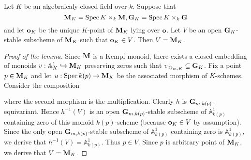 \begin{lemma}\label{lemma:open_stable_subset_of_monoid_that_contains_zero_is_monoid_itself}
Let $K$ be an algebraicaly closed field over $k$. Suppose that
$$\mathbf{M}_K = \mathrm{Spec}\, K \times_k\mathbf{M},\mathbf{G}_K =\mathrm{Spec}\, K \times_k\mathbf{G}$$
and let $\mathbf{o}_K$ be the unique $K$-point of $\mathbf{M}_K$ lying over $\mathbf{o}$. Let $V$ be an open $\mathbf{G}_K$-stable subscheme of $\mathbf{M}_K$ such that $\mathbf{o}_K\in V$. Then $V = \mathbf{M}_K$.
\end{lemma}
\begin{proof}[Proof of the lemma]
Since $\mathbf{M}$ is a Kempf monoid, there exists a closed embedding of monoids $v:\mathbb{A}^1_K\hookrightarrow \mathbf{M}_K$ preserving zeros such that $v_{\mid \mathbb{G}_{m,K}}\subseteq \mathbf{G}_K$. Fix a point $p \in \mathbf{M}_K$ and let $u:\mathrm{Spec}\, k(p)\rightarrow \mathbf{M}_K$ be the associated morphism of $K$-schemes. Consider the composition
\begin{center}
\end{center}
where the second morphism is the multiplication. Clearly $h$ is $\mathbf{G}_{m,k(p)}$-equivariant. Hence $h^{-1}(V)$ is an open $\mathbf{G}_{m,k(p)}$-stable subscheme of $\mathbb{A}^1_{k(p)}$ containing zero of this monoid $k(p)$-scheme (because $\mathbf{o}_K\in V$ by assumption). Since the only open $\mathbf{G}_{m,k(p)}$-stable subscheme of $\mathbb{A}^1_{k(p)}$ containing zero is $\mathbb{A}^1_{k(p)}$, we derive that $h^{-1}(V) = \mathbb{A}^1_{k(p)}$. Thus $p\in V$. Since $p$ is arbitrary point of $\mathbf{M}_K$, we derive that $V = \mathbf{M}_K$.
\end{proof}

